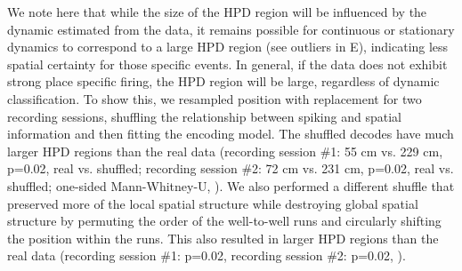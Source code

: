 \documentclass[9pt,lineno]{elife}
\begin{document}
We note here that while the size of the HPD region will be influenced by the dynamic estimated from the data, it remains possible for continuous or stationary dynamics to correspond to a large HPD region (see outliers in E), indicating less spatial certainty for those specific events. In general, if the data does not exhibit strong place specific firing, the HPD region will be large, regardless of dynamic classification. To show this, we resampled position with replacement for two recording sessions, shuffling the relationship between spiking and spatial information and then fitting the encoding model. The shuffled decodes have much larger HPD regions than the real data (recording session \#1: 55 cm vs. 229 cm, p=0.02, real vs. shuffled; recording session \#2: 72 cm vs. 231 cm, p=0.02, real vs. shuffled; one-sided Mann-Whitney-U, ). We also performed a different shuffle that preserved more of the local spatial structure while destroying global spatial structure by permuting the order of the well-to-well runs and circularly shifting the position within the runs. This also resulted in larger HPD regions than the real data (recording session \#1: p=0.02, recording session \#2: p=0.02, ).
\end{document}
